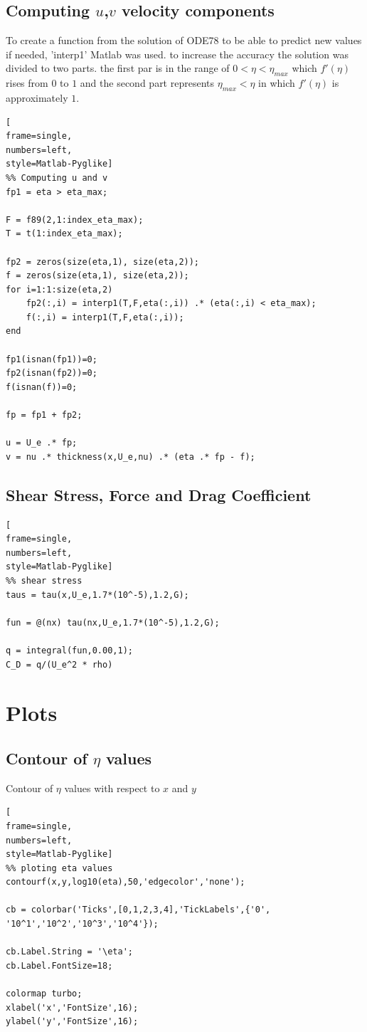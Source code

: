 \documentclass[]{report}
\begin{document}
\subsection{Computing $u$,$v$ velocity components}

To create a function from the solution of ODE78 to be able to predict new values if needed, 'interp1' Matlab was used. to increase the accuracy the solution was divided to two parts. the first par is in the range of $0<\eta<\eta_{max}$ which $f'(\eta)$ rises from $0$ to $1$ and the second part represents $\eta_{max} < \eta$ in which $f'(\eta)$ is approximately $1$.

\begin{lstlisting}[
frame=single,
numbers=left,
style=Matlab-Pyglike]
%% Computing u and v
fp1 = eta > eta_max;

F = f89(2,1:index_eta_max);
T = t(1:index_eta_max);

fp2 = zeros(size(eta,1), size(eta,2));
f = zeros(size(eta,1), size(eta,2));
for i=1:1:size(eta,2)
    fp2(:,i) = interp1(T,F,eta(:,i)) .* (eta(:,i) < eta_max);
    f(:,i) = interp1(T,F,eta(:,i));
end

fp1(isnan(fp1))=0;
fp2(isnan(fp2))=0;
f(isnan(f))=0;

fp = fp1 + fp2;

u = U_e .* fp;
v = nu .* thickness(x,U_e,nu) .* (eta .* fp - f);
\end{lstlisting}

\subsection{Shear Stress, Force and Drag Coefficient}

\begin{lstlisting}[
frame=single,
numbers=left,
style=Matlab-Pyglike]
%% shear stress
taus = tau(x,U_e,1.7*(10^-5),1.2,G);

fun = @(nx) tau(nx,U_e,1.7*(10^-5),1.2,G);

q = integral(fun,0.00,1);
C_D = q/(U_e^2 * rho)
\end{lstlisting}

\section{Plots}

\subsection{Contour of $\eta$ values}
\label{func:eta_val}
Contour of $\eta$ values with respect to $x$ and $y$
\begin{lstlisting}[
frame=single,
numbers=left,
style=Matlab-Pyglike]
%% ploting eta values
contourf(x,y,log10(eta),50,'edgecolor','none');

cb = colorbar('Ticks',[0,1,2,3,4],'TickLabels',{'0', '10^1','10^2','10^3','10^4'});

cb.Label.String = '\eta';
cb.Label.FontSize=18;

colormap turbo;
xlabel('x','FontSize',16);
ylabel('y','FontSize',16);

\end{lstlisting}
\end{document}
